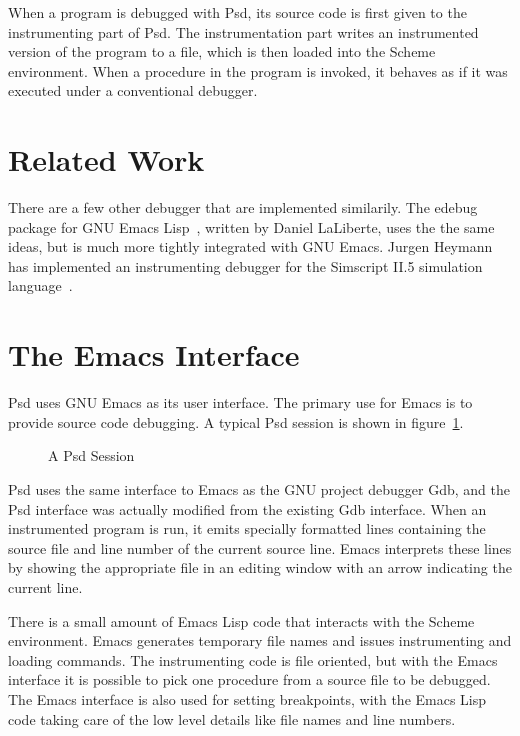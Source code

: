When a program is debugged with Psd, its source code is first given to
the instrumenting part of Psd. The instrumentation part writes an
instrumented version of the program to a file, which is then loaded
into the Scheme environment. When a procedure in the program is
invoked, it behaves as if it was executed under a conventional
debugger.

\section{Related Work}

There are a few other debugger that are implemented similarily. The
edebug package for GNU Emacs Lisp~\cite{edebug}, written by Daniel
LaLiberte, uses the the same ideas, but is much more tightly integrated
with GNU Emacs. Jurgen Heymann has implemented an instrumenting
debugger for the Simscript II.5 simulation
language~\cite{heymann:simscript-debugger}.

\section{The Emacs Interface}

Psd uses GNU Emacs as its user interface. The primary use for Emacs is
to provide source code debugging. A typical Psd session is shown in
figure~\ref{fig:session}.
\begin{figure}
\begin{center}
\leavevmode
{}
\end{center}
\caption{A Psd Session}
\label{fig:session}
\end{figure}

Psd uses the same interface to Emacs as the GNU project debugger
Gdb, and the Psd interface was actually modified from the
existing Gdb interface. When an instrumented program is run, it emits
specially formatted lines containing the source file and line number
of the current source line. Emacs interprets these lines by showing
the appropriate file in an editing window with an arrow indicating the
current line.

There is a small amount of Emacs Lisp code that interacts with the
Scheme environment. Emacs generates temporary file names and issues
instrumenting and loading commands. The instrumenting code is file
oriented, but with the Emacs interface it is possible to pick one
procedure from a source file to be debugged. The Emacs interface is
also used for setting breakpoints, with the Emacs Lisp code taking care
of the low level details like file names and line numbers.

